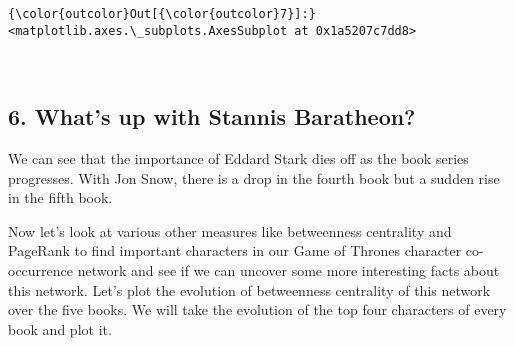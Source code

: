 \documentclass[11pt]{article}
\begin{document}
\begin{Verbatim}[commandchars=\\\{\}]
{\color{outcolor}Out[{\color{outcolor}7}]:} <matplotlib.axes.\_subplots.AxesSubplot at 0x1a5207c7dd8>
\end{Verbatim}
            
    \begin{center}
    \end{center}
    { \hspace*{\fill} \\}
    
    \subsection{6. What's up with Stannis
Baratheon?}\label{whats-up-with-stannis-baratheon}

We can see that the importance of Eddard Stark dies off as the book
series progresses. With Jon Snow, there is a drop in the fourth book but
a sudden rise in the fifth book.

Now let's look at various other measures like betweenness centrality and
PageRank to find important characters in our Game of Thrones character
co-occurrence network and see if we can uncover some more interesting
facts about this network. Let's plot the evolution of betweenness
centrality of this network over the five books. We will take the
evolution of the top four characters of every book and plot it.
\end{document}
